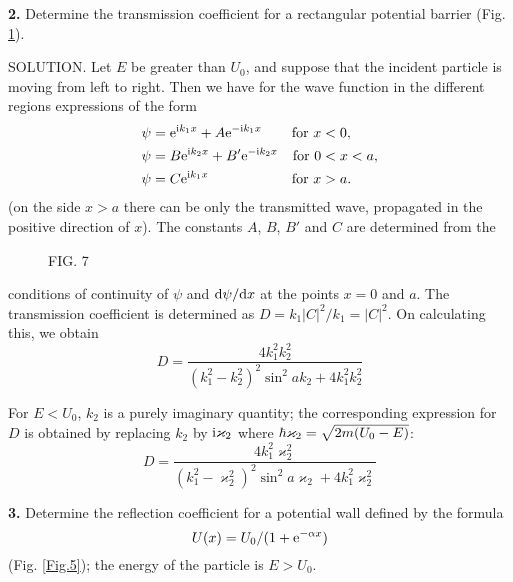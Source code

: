 {\textbf{2.} Determine the transmission coefficient for a rectangular potential barrier (Fig. \ref{Fig.7}).










SOLUTION. Let $ E $ be greater than $ U_0 $, and suppose that the incident particle is moving from left to right. Then we have for the wave function in the different regions expressions of the form
\begin{align*}
\psi&=\mathrm{e}^{\mathrm{i} k_1x}+A\mathrm{e}^{-\mathrm{i} k_1x}&\text{for }x&<0,\\
\psi&=B\mathrm{e}^{\mathrm{i} k_2 x}+B'\mathrm{e}^{-\mathrm{i} k_2x}&\text{for }0&<x<a,\\
\psi&=C\mathrm{e}^{\mathrm{i} k_1x}&\text{for }x&>a.
\end{align*}
(on the side $ x > a $ there can be only the transmitted wave, propagated in the positive direction of $ x $). The constants $ A $, $ B $, $ B' $ and $ C $ are determined from the
\begin{wrapfigure}[9]{r}[0cm]{0cm}
	\caption{FIG. 7}\label{Fig.7}
\end{wrapfigure}
conditions of continuity of $\psi$ and $ \mathrm{d}\psi/\mathrm{d} x $ at the points $ x = 0 $ and $ a $. The transmission coefficient is determined as $ D = k_1|C|^2/k_1 = |C|^2 $. On calculating this, we obtain
\[ D=\frac{4k_1^2k_2^2}{(k_1^2-k_2^2)^2\sin^2ak_2+4k_1^2k_2^2} \]



For $ E < U_0 $, $ k_2 $ is a purely imaginary quantity; the corresponding expression for $ D $ is obtained by replacing $ k_2 $ by $ \mathrm{i}\varkappa_2 $ where $ \hbar\varkappa_2=\sqrt{2m(U_0-E)} $:
\[ D=\frac{4k_1^2\varkappa_2^2}{(k_1^2-\varkappa_2^2)^2\sin^2a\varkappa_2+4k_1^2\varkappa_2^2} \]




\textbf{3.} Determine the reflection coefficient for a potential wall defined by the formula 
\[ U (x) = U_0/(1 +\mathrm{e}^{-\alpha x}) \]
(Fig. \ref{Fig.5}); the energy of the particle is $ E > U_0 $.





}
